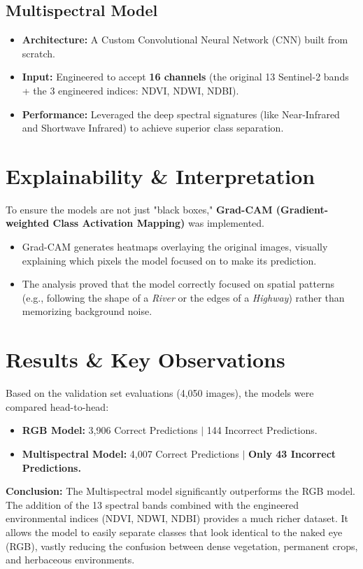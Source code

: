 \documentclass[11pt,a4paper]{article}
\begin{document}
\subsection{Multispectral Model}
\begin{itemize}
    \item \textbf{Architecture:} A Custom Convolutional Neural Network (CNN) built from scratch.
    \item \textbf{Input:} Engineered to accept \textbf{16 channels} (the original 13 Sentinel-2 bands + the 3 engineered indices: NDVI, NDWI, NDBI).
    \item \textbf{Performance:} Leveraged the deep spectral signatures (like Near-Infrared and Shortwave Infrared) to achieve superior class separation.
\end{itemize}

\section{Explainability \& Interpretation}
To ensure the models are not just "black boxes," \textbf{Grad-CAM (Gradient-weighted Class Activation Mapping)} was implemented.

\begin{itemize}
    \item Grad-CAM generates heatmaps overlaying the original images, visually explaining which pixels the model focused on to make its prediction.
    \item The analysis proved that the model correctly focused on spatial patterns (e.g., following the shape of a \textit{River} or the edges of a \textit{Highway}) rather than memorizing background noise.
\end{itemize}

\section{Results \& Key Observations}
Based on the validation set evaluations (4,050 images), the models were compared head-to-head:

\begin{itemize}
    \item \textbf{RGB Model:} 3,906 Correct Predictions $\vert$ 144 Incorrect Predictions.
    \item \textbf{Multispectral Model:} 4,007 Correct Predictions $\vert$ \textbf{Only 43 Incorrect Predictions.}
\end{itemize}

\textbf{Conclusion:} The Multispectral model significantly outperforms the RGB model. The addition of the 13 spectral bands combined with the engineered environmental indices (NDVI, NDWI, NDBI) provides a much richer dataset. It allows the model to easily separate classes that look identical to the naked eye (RGB), vastly reducing the confusion between dense vegetation, permanent crops, and herbaceous environments.
\end{document}
